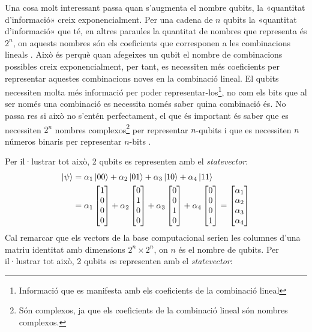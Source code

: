 Una cosa molt interessant passa quan s'augmenta el nombre qubits, la «quantitat d'informació» creix exponencialment. Per una cadena de $n$ qubits la «quantitat d'informació» que té, en altres paraules la quantitat de nombres que representa és $2^n$, on aquests nombres són els coeficients que corresponen a les combinacions lineals . Això és perquè quan afegeixes un qubit el nombre de combinacions possibles creix exponencialment, per tant, es necessiten més coeficients per representar aquestes combinacions noves en la combinació lineal. El qubits necessiten molta més informació per poder representar-los\footnote{Informació que es manifesta amb els coeficients de la combinació lineal}, no com els bits que al ser només una combinació es necessita només saber quina combinació és. No passa res si això no s'entén perfectament, el que és important és saber que es necessiten $2^n$ nombres complexos\footnote{Són complexos, ja que els coeficients de la combinació lineal són nombres complexos.} per representar $n$-qubits i que es necessiten $n$ números binaris per representar $n$-bits \cite{QCandQI:qubits}.

Per il·lustrar tot això, 2 qubits es representen amb el \textit{statevector}:
\begin{align*}
	\ket{\psi} &= \alpha_1\ket{00} + \alpha_2\ket{01} + \alpha_3\ket{10} + \alpha_4\ket{11}\\
	&= \alpha_1\begin{bmatrix} 1 \\ 0 \\ 0 \\ 0 \end{bmatrix} + \alpha_2 \begin{bmatrix} 0 \\ 1 \\ 0 \\ 0 \end{bmatrix} + \alpha_3 \begin{bmatrix} 0 \\ 0 \\ 1 \\ 0 \end{bmatrix} + \alpha_4\begin{bmatrix} 0 \\ 0 \\ 0 \\ 1 \end{bmatrix} 
	= \begin{bmatrix} \alpha_1 \\ \alpha_2 \\ \alpha_3 \\ \alpha_4 \end{bmatrix}
\end{align*}
Cal remarcar que els vectors de la base computacional serien les columnes d'una matriu identitat amb dimensions $2^n\times 2^n$, on $n$ és el nombre de qubits. Per il·lustrar tot això, 2 qubits es representen amb el \textit{statevector}:

